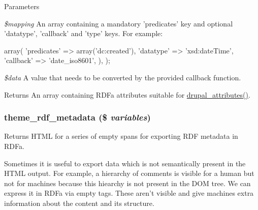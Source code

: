 \begin{DoxyParams}{Parameters}
\item[{\em \$mapping}]An array containing a mandatory 'predicates' key and optional 'datatype', 'callback' and 'type' keys. For example: 
\begin{DoxyCode}
     array(
       'predicates' => array('dc:created'),
       'datatype' => 'xsd:dateTime',
       'callback' => 'date_iso8601',
       ),
     );
\end{DoxyCode}
 \item[{\em \$data}]A value that needs to be converted by the provided callback function.\end{DoxyParams}
\begin{DoxyReturn}{Returns}
An array containing RDFa attributes suitable for \hyperlink{group__sanitization_gacf11629fb3d1ebf200863e2d15380b4a}{drupal\_\-attributes()}. 
\end{DoxyReturn}
\hypertarget{group__rdf_ga74f92e91794fd4f2fcb9abfd777a5955}{
\subsubsection[{theme\_\-rdf\_\-metadata}]{\setlength{\rightskip}{0pt plus 5cm}theme\_\-rdf\_\-metadata (\$ {\em variables})}}
\label{group__rdf_ga74f92e91794fd4f2fcb9abfd777a5955}
Returns HTML for a series of empty spans for exporting RDF metadata in RDFa.

Sometimes it is useful to export data which is not semantically present in the HTML output. For example, a hierarchy of comments is visible for a human but not for machines because this hiearchy is not present in the DOM tree. We can express it in RDFa via empty  tags. These aren't visible and give machines extra information about the content and its structure.


